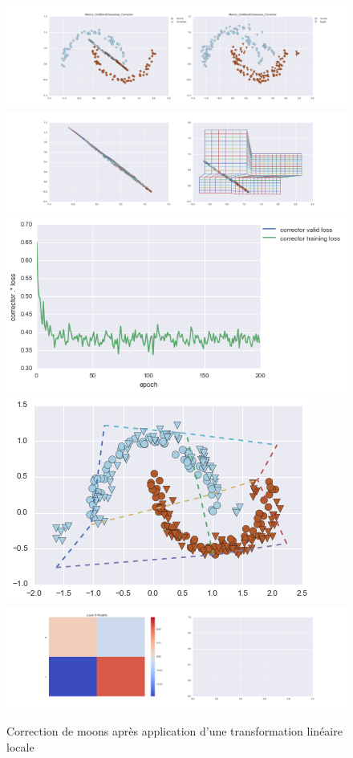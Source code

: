 \begin{figure}[H] %
\centering
\includegraphics[width=\linewidth]{fig/24-05-2016/moons/Moons_GridBendClasswise_Corrector-DATA.png}
\includegraphics[width=\linewidth]{fig/24-05-2016/moons/Moons_GridBendClasswise_Corrector-GridCheck.png}
\includegraphics[width=0.45\linewidth]{fig/24-05-2016/moons/Moons_GridBendClasswise_Corrector-Learning_curve.png}
\includegraphics[width=0.45\linewidth]{fig/24-05-2016/moons/moons_grid.png}
\includegraphics[width=\linewidth]{fig/24-05-2016/moons/Moons_GridBendClasswise_Corrector-W.png}
\caption{Correction de moons après application d'une transformation linéaire locale}
\label{fig:recap-moons-GridBend-classwise}
\end{figure}


